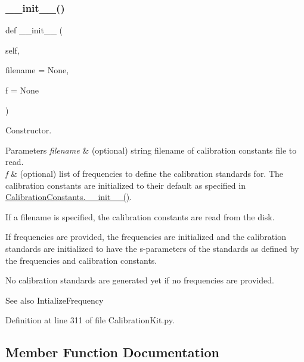 \subsubsection{\texorpdfstring{\+\_\+\+\_\+init\+\_\+\+\_\+()}{\_\_init\_\_()}}
{\footnotesize\ttfamily def \+\_\+\+\_\+init\+\_\+\+\_\+ (\begin{DoxyParamCaption}\item[{}]{self,  }\item[{}]{filename = {\ttfamily None},  }\item[{}]{f = {\ttfamily None} }\end{DoxyParamCaption})}



Constructor. 


\begin{DoxyParams}{Parameters}
{\em filename} & (optional) string filename of calibration constants file to read. \\
\hline
{\em f} & (optional) list of frequencies to define the calibration standards for. The calibration constants are initialized to their default as specified in \hyperlink{classSignalIntegrity_1_1Measurement_1_1CalKit_1_1CalibrationKit_1_1CalibrationConstants_ae64f0875afe3067b97ba370b354b9213}{Calibration\+Constants.\+\_\+\+\_\+init\+\_\+\+\_\+()}.\\
\hline
\end{DoxyParams}
If a filename is specified, the calibration constants are read from the disk.

If frequencies are provided, the frequencies are initialized and the calibration standards are initialized to have the s-\/parameters of the standards as defined by the frequencies and calibration constants.

No calibration standards are generated yet if no frequencies are provided. \begin{DoxySeeAlso}{See also}
Intialize\+Frequency 
\end{DoxySeeAlso}


Definition at line 311 of file Calibration\+Kit.\+py.



\subsection{Member Function Documentation}
\mbox{\label{classSignalIntegrity_1_1Measurement_1_1CalKit_1_1CalibrationKit_1_1CalibrationKit_a068ffbf43377a9e28cccb8b6013772ea}} 
